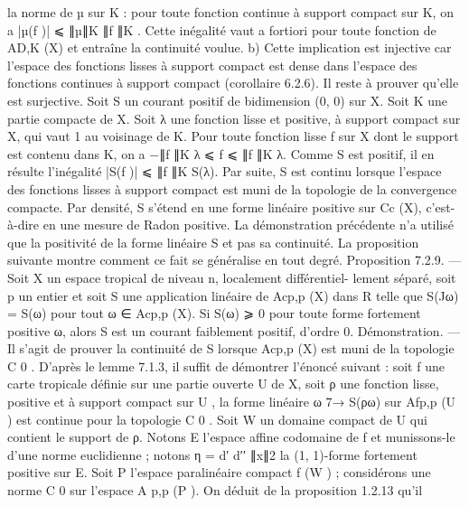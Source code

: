 \documentclass[
  10pt,
]{article}
\newenvironment{Shaded}{}{}
\newcommand{\NormalTok}[1]{#1}
\begin{document}
\begin{Shaded}
\begin{Highlighting}[]
\NormalTok{la norme de µ sur K : pour toute fonction continue à support compact sur K, on a}
\NormalTok{|µ(f )| ⩽ ∥µ∥K ∥f ∥K . Cette inégalité vaut a fortiori pour toute fonction de AD,K (X) et}
\NormalTok{entraîne la continuité voulue.}
\NormalTok{   b) Cette implication est injective car l’espace des fonctions lisses à support compact}
\NormalTok{est dense dans l’espace des fonctions continues à support compact (corollaire 6.2.6).}
\NormalTok{   Il reste à prouver qu’elle est surjective. Soit S un courant positif de bidimension (0, 0)}
\NormalTok{sur X. Soit K une partie compacte de X. Soit λ une fonction lisse et positive, à support}
\NormalTok{compact sur X, qui vaut 1 au voisinage de K. Pour toute fonction lisse f sur X dont}
\NormalTok{le support est contenu dans K, on a −∥f ∥K λ ⩽ f ⩽ ∥f ∥K λ. Comme S est positif, il en}
\NormalTok{résulte l’inégalité}
\NormalTok{                                     |S(f )| ⩽ ∥f ∥K S(λ).}
\NormalTok{Par suite, S est continu lorsque l’espace des fonctions lisses à support compact est muni}
\NormalTok{de la topologie de la convergence compacte. Par densité, S s’étend en une forme linéaire}
\NormalTok{positive sur Cc (X), c’est{-}à{-}dire en une mesure de Radon positive.}
\NormalTok{  La démonstration précédente n’a utilisé que la positivité de la forme linéaire S et}
\NormalTok{pas sa continuité. La proposition suivante montre comment ce fait se généralise en tout}
\NormalTok{degré.}
\NormalTok{Proposition 7.2.9. — Soit X un espace tropical de niveau n, localement différentiel{-}}
\NormalTok{lement séparé, soit p un entier et soit S une application linéaire de Acp,p (X) dans R}
\NormalTok{telle que S(Jω) = S(ω) pour tout ω ∈ Acp,p (X). Si S(ω) ⩾ 0 pour toute forme fortement}
\NormalTok{positive ω, alors S est un courant faiblement positif, d’ordre 0.}
\NormalTok{Démonstration. — Il s’agit de prouver la continuité de S lorsque Acp,p (X) est muni de la}
\NormalTok{topologie C 0 . D’après le lemme 7.1.3, il suffit de démontrer l’énoncé suivant : soit f une}
\NormalTok{carte tropicale définie sur une partie ouverte U de X, soit ρ une fonction lisse, positive}
\NormalTok{et à support compact sur U , la forme linéaire ω 7→ S(ρω) sur Afp,p (U ) est continue pour}
\NormalTok{la topologie C 0 .}
\NormalTok{   Soit W un domaine compact de U qui contient le support de ρ. Notons E l’espace}
\NormalTok{affine codomaine de f et munissons{-}le d’une norme euclidienne ; notons η = d′ d′′ ∥x∥2}
\NormalTok{la (1, 1){-}forme fortement positive sur E. Soit P l’espace paralinéaire compact f (W ) ;}
\NormalTok{considérons une norme C 0 sur l’espace A p,p (P ). On déduit de la proposition 1.2.13 qu’il}

\end{Highlighting}
\end{Shaded}
\end{document}
